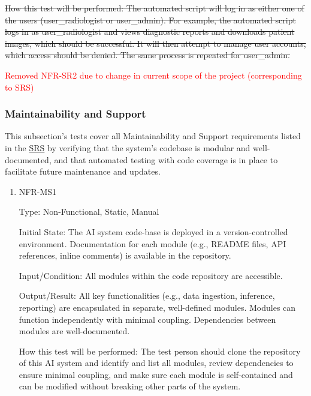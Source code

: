\documentclass[12pt, titlepage]{article}
\begin{document}
\begin{enumerate}
\begin{enumerate}
\begin{enumerate}
\begin{enumerate}
\sout{How this test will be performed: The automated script will log in as either one of the users (user\_radiologist or user\_admin). For example, the automated script logs in as user\_radiologist and views diagnostic reports and downloads patient images, which should be successful. It will then attempt to manage user accounts, which access should be denied. The same process is repeated for user\_admin.}

\textcolor{red}{Removed NFR-SR2 due to change in current scope of the project (corresponding to SRS)}

\end{enumerate}

\subsubsection{Maintainability and Support}

This subsection's tests cover all Maintainability and Support requirements listed in the \href{https://github.com/RezaJodeiri/CXR-Capstone/blob/main/docs/SRS/SRS.pdf}{SRS} \citep{SRS}
 by verifying that the system's codebase is modular and well-documented, and that automated testing with code coverage is in place to facilitate future maintenance and updates.

\begin{enumerate}

\item{NFR-MS1\\}\label{NFR-MS1}

Type: Non-Functional, Static, Manual

Initial State: The AI system code-base is deployed in a version-controlled environment. Documentation for each module (e.g., README files, API references, inline comments) is available in the repository.

Input/Condition: All modules within the code repository are accessible.

Output/Result: All key functionalities (e.g., data ingestion, inference, reporting) are encapsulated in separate, well-defined modules. Modules can function independently with minimal coupling. Dependencies between modules are well-documented.

How this test will be performed: The test person should clone the repository of this AI system and identify and list all modules, review dependencies to ensure minimal coupling, and make sure each module is self-contained and can be modified without breaking other parts of the system.


\end{enumerate}
\end{enumerate}
\end{enumerate}
\end{enumerate}
\end{document}
